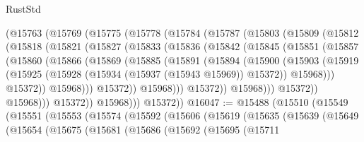 \begin{lexlean}{RustStd}
\begin{coremodule}
        (@15763
          (@15769
            (@15775
              (@15778
                (@15784
                  (@15787
                    (@15803
                      (@15809
                        (@15812
                          (@15818
                            (@15821
                              (@15827
                                (@15833
                                  (@15836
                                    (@15842
                                      (@15845
                                        (@15851
                                          (@15857
                                            (@15860
                                              (@15866
                                                (@15869
                                                  (@15885
                                                    (@15891
                                                      (@15894
                                                        (@15900
                                                          (@15903
                                                            (@15919
                                                              (@15925
                                                                (@15928
                                                                  (@15934
                                                                    (@15937 (@15943 @15969))
                                                                    @15372))
                                                                @15968)))
                                                          @15372))
                                                      @15968)))
                                                @15372))
                                            @15968)))
                                      @15372))
                                  @15968)))
                            @15372))
                        @15968)))
                  @15372))
              @15968)))
        @15372))
@16047 := @15488
    (@15510
      (@15549
        (@15551
          (@15553
            (@15574
              (@15592
                (@15606
                  (@15619
                    (@15635
                      (@15639
                        (@15649
                          (@15654
                            (@15675
                              (@15681
                                (@15686
                                  (@15692
                                    (@15695
                                      (@15711

\end{coremodule}
\end{lexlean}
